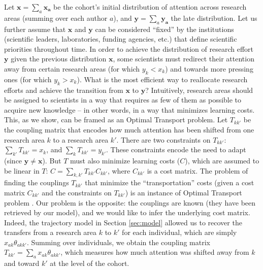 \documentclass{article}
\begin{document}
Let $\bm{x}=\sum_a \bm{x_a}$ be the cohort's initial distribution of attention across research areas (summing over each author $a$), and $\bm{y}=\sum_a \bm{y_a}$ the late distribution. Let us further assume that $\bm{x}$ and $\bm{y}$ can be considered ``fixed'' by the institutions (scientific leaders, laboratories, funding agencies, etc.) that define scientific priorities throughout time. In order to achieve the distribution of research effort $\bm{y}$ given the previous distribution $\bm{x}$, some scientists must redirect their attention away from certain research areas (for which $y_k<x_k$) and towards more pressing ones (for which $y_k>x_k$). What is the most efficient way to reallocate research efforts and achieve the transition from $\bm{x}$ to $\bm{y}$? Intuitively, research areas should be assigned to scientists in a way that requires as few of them as possible to acquire new knowledge -- in other words, in a way that minimizes learning costs. This, as we show, can be framed as an Optimal Transport problem. Let $T_{kk'}$ be the coupling matrix that encodes how much attention has been shifted from one research area $k$ to a research area $k'$. There are two constraints on $T_{kk'}$: $\sum_{k'} T_{kk'} = x_k$, and $\sum_{k} T_{kk'} = y_{k'}$. These constraints encode the need to adapt (since $\bm{y}\neq \bm{x}$). But $T$ must also minimize learning costs ($C$), which are assumed to be linear in $T$: $C=\sum_{k,k'}T_{kk'}C_{kk'}$, where $C_{kk'}$ is a cost matrix. The problem of finding the couplings $T_{kk'}$ that minimize the ``transportation'' costs (given a cost matrix $C_{kk'}$ and the constraints on $T_{kk'}$) is an instance of Optimal Transport problem \citep{Peyre2018}. Our problem is the opposite: the couplings are known (they have been retrieved by our model), and we would like to infer the underlying cost matrix. Indeed, the trajectory model in Section \ref{sec:model} allowed us to recover the transfers from a research area $k$ to $k'$ for each individual, which are simply $x_{ak}\theta_{akk'}$. Summing over individuals, we obtain the coupling matrix $T_{kk'}=\sum_a x_{ak} \theta_{akk'}$, which measures how much attention was shifted away from $k$ and toward $k'$ at the level of the cohort.
\end{document}
